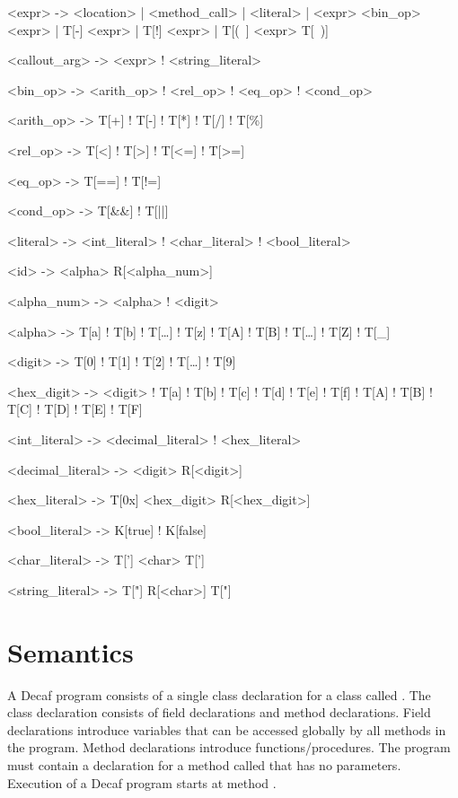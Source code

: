 \begin{bnfgrammar}
<expr> -> <location>
        | <method_call>
        | <literal>
        | <expr> <bin_op> <expr>
        | T[-] <expr>
    | T[!] <expr>
        | T[(~] <expr> T[~)]

<callout_arg> -> <expr> ! <string_literal>

<bin_op> -> <arith_op> ! <rel_op> ! <eq_op> ! <cond_op>

<arith_op> -> T[+] ! T[-] ! T[*] ! T[/] ! T[\%] %

<rel_op> -> T[<] ! T[>] ! T[<=] ! T[>=]

<eq_op>   -> T[==] ! T[!=]

<cond_op> -> T[\&\&] ! T[||]

<literal> -> <int_literal> ! <char_literal> ! <bool_literal>

<id> -> <alpha> R[<alpha_num>]

<alpha_num> -> <alpha> ! <digit>

<alpha> -> T[a] ! T[b] ! T[\ldots{}] ! T[z] ! T[A] ! T[B] ! T[\ldots{}] ! T[Z] ! T[\_]

<digit> -> T[0] ! T[1] ! T[2] ! T[\ldots] ! T[9]

<hex_digit> -> <digit> ! T[a] ! T[b] ! T[c] ! T[d] ! T[e] ! T[f] ! T[A] ! T[B] ! T[C] ! T[D] ! T[E] ! T[F]

<int_literal> -> <decimal_literal> ! <hex_literal>

<decimal_literal> -> <digit> R[<digit>]

<hex_literal> -> T[0x] <hex_digit> R[<hex_digit>]

<bool_literal> -> K[true] ! K[false]

<char_literal> -> T['] <char> T[']

<string_literal> -> T["] R[<char>] T["]
\end{bnfgrammar}

\section*{Semantics}
\def\arrayint{\kw{array}\term{\[\kw{int}\]}}
\def\arraybool{\kw{array}\term{\[\kw{bool}\]}}
\def\arrayT{\kw{array}\term{\[T\]}}

A Decaf program consists of a single class declaration
for a class called . The class declaration consists of
field declarations and method declarations.  Field declarations
introduce variables that can be accessed globally by all methods in
the program.  Method declarations introduce functions/procedures.  The
program must contain a declaration for a method called  that
has no parameters.  Execution of a Decaf program starts
at method .

